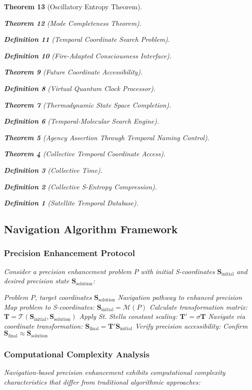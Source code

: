 \documentclass[12pt,a4paper]{article}
\newtheorem{theorem}{Theorem}[section]
\newtheorem{definition}[theorem]{Definition}
\begin{document}
\begin{theorem}[Oscillatory Entropy Theorem]
\begin{theorem}[Mode Completeness Theorem]
\begin{enumerate}
\begin{definition}[Temporal Coordinate Search Problem]
\begin{algorithm}
\begin{definition}[Fire-Adapted Consciousness Interface]
\begin{theorem}[Future Coordinate Accessibility]
\begin{definition}[Virtual Quantum Clock Processor]
\begin{itemize}
\begin{itemize}
\begin{theorem}[Thermodynamic State Space Completion]
\begin{definition}[Temporal-Molecular Search Engine]
\begin{theorem}[Agency Assertion Through Temporal Naming Control]
\begin{remark}
\begin{theorem}[Collective Temporal Coordinate Access]
\begin{definition}[Collective Time]
\begin{definition}[Collective S-Entropy Compression]
\begin{definition}[Satellite Temporal Database]
\begin{algorithm}
\begin{table}[h]
{{\subsection{Navigation Algorithm Framework}

\subsubsection{Precision Enhancement Protocol}

Consider a precision enhancement problem $P$ with initial S-coordinates $\mathbf{S}_{\text{initial}}$ and desired precision state $\mathbf{S}_{\text{solution}}$:

\begin{algorithm}[H]
\caption{S-Entropy Precision Navigation}
\begin{algorithmic}[1]
\REQUIRE Problem $P$, target coordinates $\mathbf{S}_{\text{solution}}$
\ENSURE Navigation pathway to enhanced precision
\STATE Map problem to S-coordinates: $\mathbf{S}_{\text{initial}} = \mathcal{M}(P)$
\STATE Calculate transformation matrix: $\mathbf{T} = \mathcal{T}(\mathbf{S}_{\text{initial}}, \mathbf{S}_{\text{solution}})$
\STATE Apply St. Stella constant scaling: $\mathbf{T}' = \sigma \mathbf{T}$
\STATE Navigate via coordinate transformation: $\mathbf{S}_{\text{final}} = \mathbf{T}' \mathbf{S}_{\text{initial}}$
\STATE Verify precision accessibility: Confirm $\mathbf{S}_{\text{final}} \approx \mathbf{S}_{\text{solution}}$
\end{algorithmic}
\end{algorithm}

\subsubsection{Computational Complexity Analysis}

Navigation-based precision enhancement exhibits computational complexity characteristics that differ from traditional algorithmic approaches:

}}
\end{table}
\end{algorithm}
\end{definition}
\end{definition}
\end{definition}
\end{theorem}
\end{remark}
\end{theorem}
\end{definition}
\end{theorem}
\end{itemize}
\end{itemize}
\end{definition}
\end{theorem}
\end{definition}
\end{algorithm}
\end{definition}
\end{enumerate}
\end{theorem}
\end{theorem}
\end{document}
